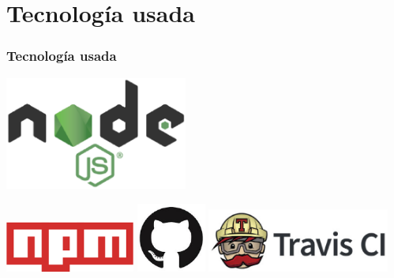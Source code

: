 \documentclass{beamer}
\begin{document}
\begin{frame}
\end{frame}


\section{Tecnología usada}
\begin{frame}
  \frametitle{Tecnología usada}
  
  \begin{center}
  	\includegraphics[width=0.45\textwidth]{images/nodejs-logo.eps}
  
  
        		\includegraphics[width=0.32\textwidth]{images/npm.eps}
        		\hspace*{1cm}
          		\includegraphics[width=0.17\textwidth]{images/github.eps}
          		        		\hspace*{0.3cm}
          		\includegraphics[width=0.45\textwidth]{images/travis-ci-logo.eps}
  \end{center}
  
	 
  

\end{frame}
\end{document}
